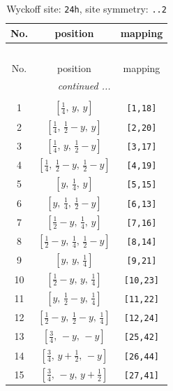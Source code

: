 \documentclass[fleqn,8pt]{jsarticle}
\begin{document}
\begin{longtable}{ccc}
\caption{Wyckoff site: {\tt 24h}, site symmetry: {\tt ..2}}
 \\
 \hline \hline
No. & position & mapping \\ \hline \endfirsthead

\multicolumn{2}{l}{\tablename\ \thetable{}} \\
 \hline \hline
No. & position & mapping \\ \hline \endhead

 \hline \hline
\multicolumn{2}{r}{\footnotesize\it continued ...} \\ \endfoot

 \hline \hline
\multicolumn{2}{r}{} \\ \endlastfoot

1 & $\left[ \frac{1}{4},\, y,\, y \right]$ & {\tt [1,18]} \\ \hline
2 & $\left[ \frac{1}{4},\, \frac{1}{2} - y,\, y \right]$ & {\tt [2,20]} \\ \hline
3 & $\left[ \frac{1}{4},\, y,\, \frac{1}{2} - y \right]$ & {\tt [3,17]} \\ \hline
4 & $\left[ \frac{1}{4},\, \frac{1}{2} - y,\, \frac{1}{2} - y \right]$ & {\tt [4,19]} \\ \hline
5 & $\left[ y,\, \frac{1}{4},\, y \right]$ & {\tt [5,15]} \\ \hline
6 & $\left[ y,\, \frac{1}{4},\, \frac{1}{2} - y \right]$ & {\tt [6,13]} \\ \hline
7 & $\left[ \frac{1}{2} - y,\, \frac{1}{4},\, y \right]$ & {\tt [7,16]} \\ \hline
8 & $\left[ \frac{1}{2} - y,\, \frac{1}{4},\, \frac{1}{2} - y \right]$ & {\tt [8,14]} \\ \hline
9 & $\left[ y,\, y,\, \frac{1}{4} \right]$ & {\tt [9,21]} \\ \hline
10 & $\left[ \frac{1}{2} - y,\, y,\, \frac{1}{4} \right]$ & {\tt [10,23]} \\ \hline
11 & $\left[ y,\, \frac{1}{2} - y,\, \frac{1}{4} \right]$ & {\tt [11,22]} \\ \hline
12 & $\left[ \frac{1}{2} - y,\, \frac{1}{2} - y,\, \frac{1}{4} \right]$ & {\tt [12,24]} \\ \hline
13 & $\left[ \frac{3}{4},\, - y,\, - y \right]$ & {\tt [25,42]} \\ \hline
14 & $\left[ \frac{3}{4},\, y + \frac{1}{2},\, - y \right]$ & {\tt [26,44]} \\ \hline
15 & $\left[ \frac{3}{4},\, - y,\, y + \frac{1}{2} \right]$ & {\tt [27,41]} \\ \hline

\end{longtable}
\end{document}
